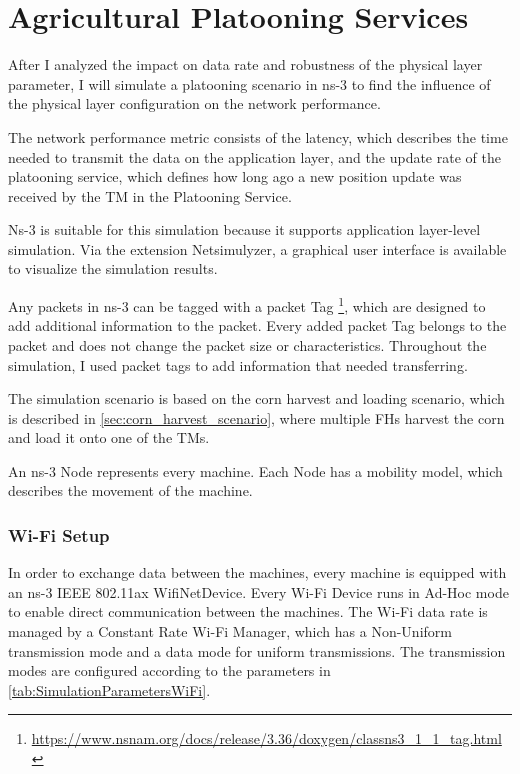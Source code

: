 \section{Agricultural Platooning Services}

After I analyzed the impact on data rate and robustness of the physical layer parameter, I will simulate a platooning scenario in ns-3 to find the influence of the physical layer configuration on the network performance.


The network performance metric consists of the latency, which describes the time needed to transmit the data
on the application layer, and the update rate of the platooning service, which defines how long ago a new position update
was received by the \ac{TM} in the Platooning Service.

Ns-3 is suitable for this simulation because it supports application layer-level simulation.
Via the extension Netsimulyzer, a graphical user interface is available to visualize the simulation results.

Any packets in ns-3 can be tagged with a packet Tag \footnote{\url{https://www.nsnam.org/docs/release/3.36/doxygen/classns3_1_1_tag.html}},
which are designed to add additional information to the packet.
Every added packet Tag belongs to the packet and does not change the packet size or characteristics.
Throughout the simulation, I used packet tags to add information that needed transferring.

The simulation scenario is based on the corn harvest and loading scenario, which is described in \autoref{sec:corn_harvest_scenario}, where
multiple \ac{FH}s harvest the corn and load it onto one of the \ac{TM}s.

An ns-3 Node represents every machine.
Each Node has a mobility model, which describes the movement of the machine.

\subsubsection*{Wi-Fi Setup}
In order to exchange data between the machines, every machine is equipped with an  ns-3 IEEE 802.11ax WifiNetDevice.
Every Wi-Fi Device runs in Ad-Hoc mode to enable direct communication
between the machines.
The Wi-Fi data rate is managed by a Constant Rate Wi-Fi Manager, which has a Non-Uniform
transmission mode and a data mode for uniform transmissions.
The transmission modes are configured according
to the parameters in \autoref{tab:SimulationParametersWiFi}.

